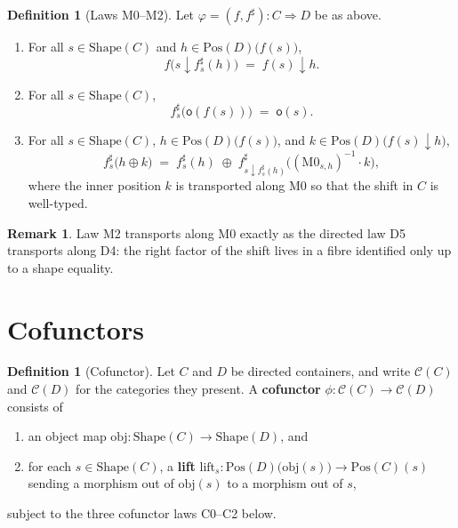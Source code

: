 \documentclass[11pt,a4paper]{article}
\theoremstyle{plain}
\theoremstyle{definition}
\newtheorem{definition}[theorem]{Definition}
\newtheorem{remark}[theorem]{Remark}
\newcommand{\Shape}{\mathrm{Shape}}
\newcommand{\Pos}{\mathrm{Pos}}
\newcommand{\rootpos}{\mathsf{o}}
\newcommand{\sub}{\mathbin{\downarrow}}
\newcommand{\shift}{\oplus}
\newcommand{\cat}{\mathcal{C}}
\begin{document}
\begin{definition}[Laws M0--M2]\label{def:m-laws}
Let $\varphi=(f,f^\sharp):C\Rightarrow D$ be as above.
\begin{enumerate}
  \item[\textbf{M0} (codomain).]
        For all $s\in\Shape(C)$ and $h\in\Pos(D)\bigl(f(s)\bigr)$,
        \[
          f\bigl(s\sub f^\sharp_s(h)\bigr)
          \;=\;
          f(s)\sub h.
        \]
  \item[\textbf{M1} (unit).]
        For all $s\in\Shape(C)$,
        \[
          f^\sharp_s\bigl(\rootpos(f(s))\bigr)
          \;=\;
          \rootpos(s).
        \]
  \item[\textbf{M2} (composition).]
        For all $s\in\Shape(C)$, $h\in\Pos(D)\bigl(f(s)\bigr)$, and
        $k\in\Pos(D)\bigl(f(s)\sub h\bigr)$,
        \[
          f^\sharp_s\bigl(h\shift k\bigr)
          \;=\;
          f^\sharp_s(h)
          \;\shift\;
          f^\sharp_{s\sub f^\sharp_s(h)}
            \bigl((\mathrm{M0}_{s,h})^{-1}\cdot k\bigr),
        \]
        where the inner position $k$ is transported along M0 so that the shift
        in $C$ is well-typed.
\end{enumerate}
\end{definition}

\begin{remark}
Law M2 transports along M0 exactly as the directed law D5 transports along
D4: the right factor of the shift lives in a fibre identified only up to a
shape equality.
\end{remark}

\section{Cofunctors}

\begin{definition}[Cofunctor]\label{def:cofunctor}
Let $C$ and $D$ be directed containers, and write $\cat(C)$ and $\cat(D)$ for
the categories they present. A \textbf{cofunctor} $\phi:\cat(C)\to\cat(D)$
consists of
\begin{enumerate}
  \item an object map $\mathrm{obj}:\Shape(C)\to\Shape(D)$, and
  \item for each $s\in\Shape(C)$, a \textbf{lift}
        $\mathrm{lift}_s:\Pos(D)\bigl(\mathrm{obj}(s)\bigr)\to\Pos(C)(s)$
        sending a morphism out of $\mathrm{obj}(s)$ to a morphism out of $s$,
\end{enumerate}
subject to the three cofunctor laws C0--C2 below.
\end{definition}
\end{document}
